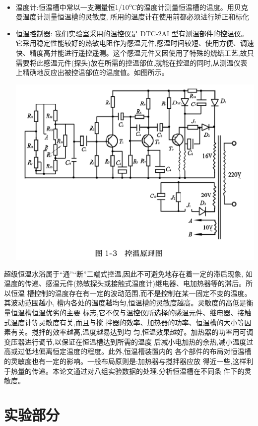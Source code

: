 \documentclass[11pt]{report}
\begin{document}
\begin{itemize}
\item 温度计:恒温槽中常以一支测量恒1/10\textsuperscript{o}C的温度计测量恒温槽的温度。用贝克曼温度计测量恒温槽的灵敏度, 所用的温度计在使用前都必须进行矫正和标化

\item 恒温控制器: 我们实验室采用的温控仪是 DTC-2AI 型有测温部件的控温仪。它采用稳定性能较好的热敏电阻作为感温元件,感温时间较短、使用方便、调速快、精度高并能进行遥控遥测。这个感温元件又因使用了特殊的烧结工艺,故只需要将此感温元件(探头)放在所需的控温部位,就能在控温的同时,从测温仪表上精确地反应出被控温部位的温度值。如图所示。
\begin{center}
\includegraphics[width=.9\linewidth]{../img/3.png}
\end{center}
\end{itemize}




超级恒温水浴属于“通”“断”二端式控温,因此不可避免地存在着一定的滞后现象,
如温度的传递、感温元件(热敏探头或接触式温度计)继电器、电加热器等的滞后。所以恒温
槽控制的温度存在有一定的波动范围,而不是控制在某一固定不变的温度。其波动范围越小,
槽内各处的温度越均匀,恒温槽的灵敏度越高。灵敏度的高低是衡量恒温槽恒温优劣的主要
标志,它不仅与温控仪所选择的感温元件、继电器、接触式温度计等灵敏度有关,而且与搅
拌器的效率、加热器的功率、恒温槽的大小等因素有关。搅拌的效率越高,温度越易达到均
匀,恒温效果越好。加热器的功率用可调变压器进行调节,以保证在恒温槽达到所需的温度
后减小电加热的余热,减小温度过高或过低地偏离恒定温度的程度。此外,恒温槽装置内的
各个部件的布局对恒温槽的灵敏度也有一定的影响。一般布局原则是:加热器与搅拌器应放
得近一些,这样利于热量的传递。本论文通过对八组实验数据的处理,分析恒温槽在不同条
件下的灵敏度。

\part{实验部分}
\label{sec:orgf64cf7b}
\end{document}
